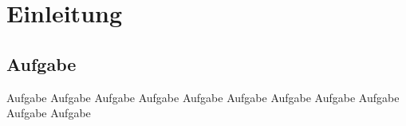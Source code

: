 \chapter*{Einleitung}
\section*{Aufgabe}
Aufgabe Aufgabe Aufgabe Aufgabe Aufgabe Aufgabe Aufgabe Aufgabe Aufgabe Aufgabe Aufgabe 

